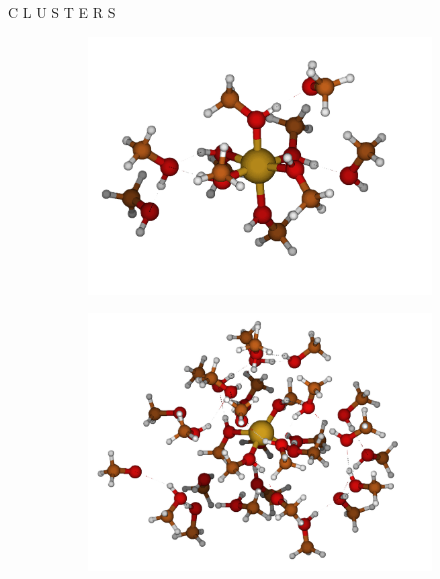 \documentclass[final]{beamer}
\newlength{\colwidth}
\begin{document}
\begin{frame}[t]
\begin{columns}[t]
		\begin{column}{\colwidth}

			\begin{alertblock}{C L U S T E R S}

				\begin{figure}[H]
					\centering
					\begin{subfigure}[b]{0.27\textwidth}
						\centering
						\includegraphics[width=\textwidth]{logos/Cu-10CH4O.png}
						\caption{}
						\label{fig:cu-10ch4o}
					\end{subfigure}%
					\hfill
					\begin{subfigure}[b]{0.27\textwidth}
						\centering
						\includegraphics[width=\textwidth]{logos/Cu-30CH4O.png}

\end{subfigure}
\end{figure}
\end{alertblock}
\end{column}
\end{columns}
\end{frame}
\end{document}
